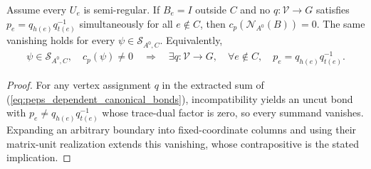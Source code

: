 \begin{lemma}%
    \label{thm:peps_dependent_uncut_coefficients}
    \leanok
    Assume every $U_e$ is semi-regular. If $B_e=I$ outside $C$ and no
    $q:\mathcal V\to G$ satisfies
    $p_e=q_{h(e)}q_{t(e)}^{-1}$ simultaneously for all $e\notin C$, then
    $c_p(\mathcal N_{A^0}(B))=0$. The same vanishing holds for every
    $\psi\in\mathcal S_{A^0,C}$. Equivalently,
    \begin{align}
        \psi\in\mathcal S_{A^0,C},\quad c_p(\psi)\ne0
        \quad\Longrightarrow\quad
        \exists q:\mathcal V\to G,\quad
        \forall e\notin C,\quad p_e=q_{h(e)}q_{t(e)}^{-1}.
        \label{eq:peps_dependent_uncut_coefficients}
    \end{align}
\end{lemma}
\begin{proof}\leanok
    For any vertex assignment $q$ in the extracted sum of
    (\ref{eq:peps_dependent_canonical_bonds}), incompatibility yields
    an uncut bond with $p_e\ne q_{h(e)}q_{t(e)}^{-1}$ whose trace-dual
    factor is zero, so every summand vanishes. Expanding an arbitrary boundary
    into fixed-coordinate columns and using their matrix-unit
    realization extends this vanishing, whose contrapositive is the stated implication.
\end{proof}
